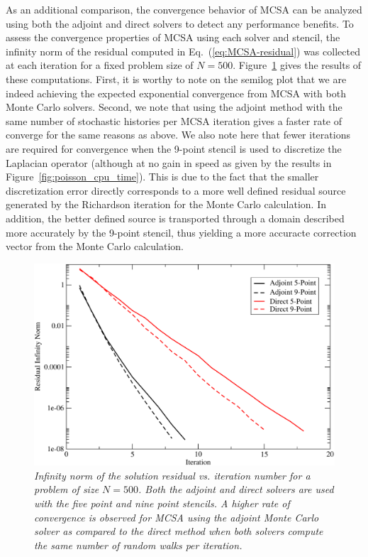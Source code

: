 \documentclass[preprint,12pt]{elsarticle}
\begin{document}
As an additional comparison, the convergence behavior of MCSA can be analyzed
using both the adjoint and direct solvers to detect any performance
benefits. To assess the convergence properties of MCSA using each solver and
stencil, the infinity norm of the residual computed in
Eq.~(\ref{eq:MCSA-residual}) was collected at each iteration for a fixed
problem size of $N=500$. Figure~\ref{fig:poisson_convergence} gives the
results of these computations. First, it is worthy to note on the semilog plot
that we are indeed achieving the expected exponential convergence from MCSA
with both Monte Carlo solvers. Second, we note that using the adjoint method
with the same number of stochastic histories per MCSA iteration gives a faster
rate of converge for the same reasons as above. We also note here that fewer
iterations are required for convergence when the 9-point stencil is used to
discretize the Laplacian operator (although at no gain in speed as given by
the results in Figure~\ref{fig:poisson_cpu_time}). This is due to the fact
that the smaller discretization error directly corresponds to a more well
defined residual source generated by the Richardson iteration for the Monte
Carlo calculation. In addition, the better defined source is transported
through a domain described more accurately by the 9-point stencil, thus
yielding a more accuracte correction vector from the Monte Carlo calculation.
\begin{figure}[ht!]
  \centering
  \includegraphics[width=5in,clip]{dir_adj_conv.pdf}
  \caption{\sl Infinity norm of the solution residual vs. iteration
    number for a problem of size $N=500$. Both the adjoint and direct
    solvers are used with the five point and nine point stencils. A
    higher rate of convergence is observed for MCSA using the adjoint
    Monte Carlo solver as compared to the direct method when both
    solvers compute the same number of random walks per iteration.}
  \label{fig:poisson_convergence}
\end{figure}
\end{document}
